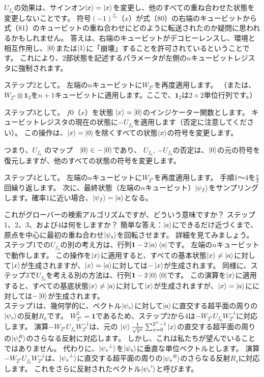 $U_{f_a}$の効果は、サインオン$\ket{x}= \ket{x}$を変更し、他のすべての重ね合わせた状態を変更しないことです。 符号$(-1)^{f_a}（x）$が式（80）の右端のキュービットから式（81）のキュービットの重ね合わせにどのように転送されたのか疑問に思われるかもしれません。 答えは、右端のキュービットがデコヒーレンスし、環境と相互作用し、$\ket{0}$または$\ket{1}$に「崩壊」することを許可されているということです。 これにより、2部状態を記述するパラメータが左側の$n$キュービットレジスタに強制されます。

ステップ2として。 左端の$n$キュービットに$W_{2^n}$を再度適用します。 （または、$W_{2^n} \otimes \mathbf{1}_2 $を$n + 1$キュービットに適用します。ここで、$\mathbf{1}_2$は$2 \times 2$単位行列です。） 

ステップ3として。 $f0（x）$を状態 $\ket{x}= \ket{0}$のインジケーター関数とします。 キュービットレジスタの現在の状態に$ -U_{f_0}$を適用します（否定に注意してください）。 この操作は、$\ket{x}= \ket{0}$を除くすべての状態$\ket{x}$の符号を変更します。 

つまり、$ U_{f_0} $  
のマップ　$ \ket{0} \in - \ket{0} $であり、
$ U_{f_0}$, $ − U_{f_0} $の否定は、$ \ket{0} $の元の符号を復元しますが、他のすべての状態の符号を変更します。

ステップ4として。 左端の$n$キュービットに$W_{2^n}$を再度適用します。
手順1〜4を$ \frac{\pi}{4} $回繰り返します。 次に、最終状態（左端の$n$キュービット）$\ket{\psi_f} $をサンプリングします。確率1に近い場合、$ \ket{\psi_f} = \ket{a}$となる。 

これがグローバーの検索アルゴリズムですが、どういう意味ですか？ ステップ1、2、3、および4は何をしますか？ 簡単な答え：$\ket{a}$にできるだけ近づくまで、原点を中心に最初の重ね合わせ$\ket{\psi_s}$を回転させます。 詳細を見てみましょう。 \\

ステップ1での$U_{f_a}$の別の考え方は、行列$\mathbf{1} - 2 \ket{a} \bra{a}$です。 左端の$n$キュービットで動作します。 この操作を$\ket{x}$に適用すると、すべての基本状態$\ket{x} \ne \ket{a}$に対して$\ket{x}$が生成されますが、$\ket{x} = \ket{a}$に対しては$ - \ket{x}$が生成されます。 同様に、ステップ3で$U_{f_0}$を考える別の方法は、行列$\mathbf{1} - 2 \ket{0} \bra{0}$です。 この演算を$\ket{x}$に適用すると、すべての基底状態$\ket{x} \ne \ket{a}$に対して$\ket{x}$が生成されますが、$\ket{x} = \ket{a}$にに対しては$ - \ket{0}$が生成されます。\\

ステップ1は、幾何学的に、ベクトル$ \ket{\psi_s}$に対して$ \ket{a}$に直交する超平面の周りの$\ket{\psi_s}$の反射$R_a$です。
$W_{2^n}^{2} = \mathbf{1}$であるため、ステップ2から4は$-W_{2^n} U_{f_0} W_{2^n}^{-1}$に対応します。
演算$-W_{2^n} U_{f_0} W_{2^n}^{-1}$は、元の $ \ket{\psi} \frac{1}{\sqrt{2^n}} \sum_{x=0}^{2^n-1} \ket{x}$の直交する超平面の周りの$\ket{\psi_s^R}$のさらなる反射に対応します。
しかし、これは私たちが望んでいることではありません。 代わりに、$\ket{{\psi_s}^{\bot}}$を$\ket{\psi_s}$に垂直な単位ベクトルとします。
演算$-W_{2^n} U_{f_0} W_{2^n}^{-1}$は、$\ket{{\psi_s}^{\bot}}$に直交する超平面の周りの$\ket{{\psi_s}^{R}}$のさらなる反射$R_s$に対応します。
これをさらに反射されたベクトル$\ket{ {\psi_s}^{\prime}}$と呼びます。

